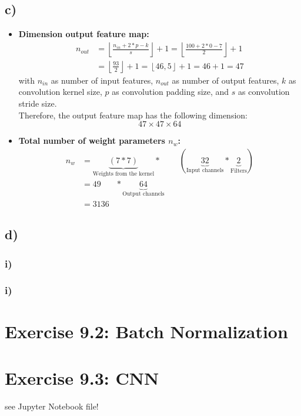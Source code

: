 \documentclass[a4paper]{article}
\begin{document}
\newpage
    \subsection*{c)}
        \begin{itemize}
            \item \textbf{Dimension output feature map:}\\
                \begin{align}
                    n_{out} &= \left\lfloor \frac{n_{in} + 2*p - k}{s} \right\rfloor + 1
                    = \left\lfloor \frac{100 + 2*0 - 7}{2} \right\rfloor + 1\\
                    &= \left\lfloor \frac{93}{2} \right\rfloor + 1
                    = \left\lfloor 46,5 \right\rfloor + 1 = 46 + 1 = 47
                \end{align}
                with $n_{in}$ as number of input features, $n_{out}$ as number of output features, $k$ as convolution kernel size, 
                $p$ as convolution padding size, and $s$ as convolution stride size.\\
                Therefore, the output feature map has the following dimension:
                $$47 \times 47 \times 64$$
            
            \item \textbf{Total number of weight parameters $n_w$:}\\
                \begin{align}
                    n_w &= \underbrace{(7 * 7)}_{\text{Weights from the kernel}} *\ \ \ \ \ \ \ \ \ \  (\underbrace{32}_{\text{Input channels}} * \underbrace{2}_{\text{Filters}})\\ 
                    &= 49\ \ \ \ \ \ \ \  * \underbrace{64}_{\text{Output channels}}\\ 
                    &= 3136
                \end{align}

        \end{itemize}

    \subsection*{d)}
        \subsubsection*{i)}
            

        \subsubsection*{i)}
            



\newpage
\section*{Exercise 9.2: Batch Normalization}
    




\newpage
\section*{Exercise 9.3: CNN}
    see Jupyter Notebook file!
\end{document}
